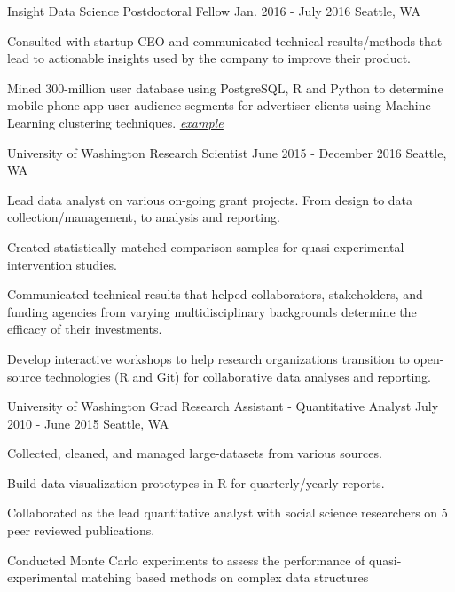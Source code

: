 \begin{cventries}
 	\cventry
	{Insight Data Science}
	{Postdoctoral Fellow}
	{Jan. 2016 - July 2016}
	{Seattle, WA}
	{
	\begin{cvitems}
		\item {Consulted with startup CEO and communicated technical results/methods that lead to actionable insights used by the company to improve their product.}
		\item {Mined 300-million user database using PostgreSQL, R and Python to determine mobile phone app user audience segments for advertiser clients using Machine Learning clustering techniques. \href{https://youtu.be/QwjuLMO930E}{\underline{\textit{example}}}}
	\end{cvitems}
	}
   \cventry
    {University of Washington}
    {Research Scientist}
    {June 2015 - December 2016}
    {Seattle, WA}
    {
      \begin{cvitems}
        \item{Lead data analyst on various on-going grant projects.  From design to data collection/management, to analysis and reporting.}
        \item{Created statistically matched comparison samples for quasi experimental intervention studies.}
        \item{Communicated technical results that helped collaborators, stakeholders, and funding agencies from varying multidisciplinary backgrounds determine the efficacy of their investments.}
        \item{Develop interactive workshops to help research organizations transition to open-source technologies (R and Git) for collaborative data analyses and reporting.}
      \end{cvitems}
    }
  \cventry
    {University of Washington}
    {Grad Research Assistant - Quantitative Analyst}
    {July 2010 - June 2015}
    {Seattle, WA}
    {
      \begin{cvitems}
        \item{Collected, cleaned, and managed large-datasets from various sources.}
        \item{Build data visualization prototypes in R for quarterly/yearly reports.}
        \item{Collaborated as the lead quantitative analyst with social science researchers on 5 peer reviewed publications.}
        \item{Conducted Monte Carlo experiments to assess the performance of quasi-experimental matching based methods on complex data structures}
      \end{cvitems}
    }


\end{cventries}
